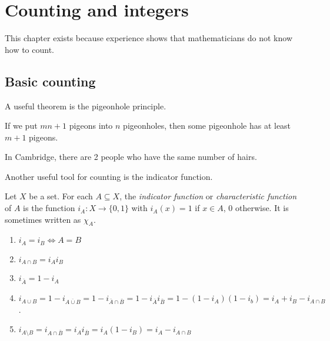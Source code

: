 \documentclass[a4paper]{article}
\begin{document}
\section{Counting and integers}
This chapter exists because experience shows that mathematicians do not know how to count.

\subsection{Basic counting}
A useful theorem is the pigeonhole principle.
\begin{thm}
  If we put $mn + 1$ pigeons into $n$ pigeonholes, then some pigeonhole has at least $m + 1$ pigeons.
\end{thm}

\begin{eg}
  In Cambridge, there are 2 people who have the same number of hairs.
\end{eg}

Another useful tool for counting is the indicator function.
\begin{defi}
  Let $X$ be a set. For each $A\subseteq X$, the \emph{indicator function} or \emph{characteristic function} of $A$ is the function $i_A: X\to \{0, 1\}$ with $i_A(x) = 1$ if $x\in A$, $0$ otherwise. It is sometimes written as $\chi_A$.
\end{defi}
\begin{prop}\leavevmode
  \begin{enumerate}
    \item $i_A = i_B \Leftrightarrow A = B$
    \item $i_{A\cap B} = i_A i_B$
    \item $i_{\bar{A}} = 1 - i_A$
    \item $i_{A\cup B} = 1 - i_{\overline{A\cup B}}  = 1 - i_{\bar A\cap \bar B} = 1 - i_{\bar{A}}i_{\bar{B}} = 1 - (1 - i_A)(1 - i_b) = i_A + i_B - i_{A\cap B}$.
    \item $i_{A\setminus B} = i_{A\cap \bar B} = i_Ai_{\bar B} = i_A(1 - i_B) = i_A - i_{A\cap B}$
  \end{enumerate}
\end{prop}
\end{document}
